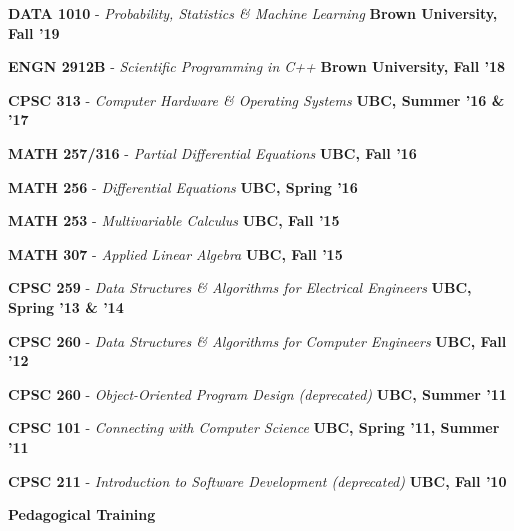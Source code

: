 \documentclass[margin,line]{res}
\newenvironment{list1}{
  \begin{list}{\ding{113}}{
      \setlength{\itemsep}{0in}
      \setlength{\parsep}{0in} \setlength{\parskip}{0in}
      \setlength{\topsep}{0in} \setlength{\partopsep}{0in}
      \setlength{\leftmargin}{0.17in}}}{\end{list}}
\begin{document}
\begin{resume}
\begin{list1}
\setlength\itemsep{0.25em}
\item[] {\bf DATA 1010} - \textit{Probability, Statistics \& Machine Learning} \hfill {\bf \small Brown University, Fall '19}
\item[] {\bf ENGN 2912B} - \textit{Scientific Programming in C++} \hfill {\bf \small Brown University, Fall '18}
\item[] {\bf CPSC 313} - \textit{Computer Hardware \& Operating Systems} \hfill {\bf \small UBC, Summer '16 \& '17}
\item[] {\bf MATH 257/316} - \textit{Partial Differential Equations} \hfill {\bf \small UBC, Fall '16}
\item[] {\bf MATH 256} - \textit{Differential Equations} \hfill {\bf \small UBC, Spring '16}
\item[] {\bf MATH 253} - \textit{Multivariable Calculus} \hfill {\bf \small UBC, Fall '15}
\item[] {\bf MATH 307} - \textit{Applied Linear Algebra} \hfill {\bf \small UBC, Fall '15}
\item[] {\bf CPSC 259} - \textit{Data Structures \& Algorithms for Electrical Engineers} \hfill {\bf \small UBC, Spring '13 \& '14}
\item[] {\bf CPSC 260} - \textit{Data Structures \& Algorithms for Computer Engineers} \hfill {\bf \small UBC, Fall '12}
\item[] {\bf CPSC 260} - \textit{Object-Oriented Program Design (deprecated)} \hfill {\bf \small UBC, Summer '11}
\item[] {\bf CPSC 101} - \textit{Connecting with Computer Science} \hfill {\bf \small UBC, Spring '11, Summer '11}
\item[] {\bf CPSC 211} - \textit{Introduction to Software Development (deprecated)} \hfill {\bf \small UBC, Fall '10}
\end{list1}

\textbf{Pedagogical Training}
\vspace*{.2cm}


\end{resume}
\end{document}

